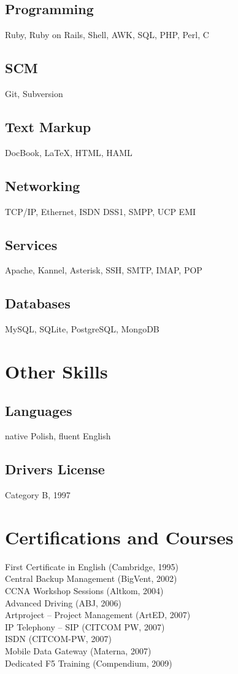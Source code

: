 \documentclass[9pt,a4paper,twocolumn]{extarticle}
\begin{document}
\subsection*{Programming}
Ruby, Ruby on Rails, Shell, AWK, SQL, PHP, Perl, C
\subsection*{SCM}
Git, Subversion
\subsection*{Text Markup}
DocBook, \LaTeX, HTML, HAML
\subsection*{Networking}
TCP/IP, Ethernet, ISDN DSS1, SMPP, UCP EMI
\subsection*{Services}
Apache, Kannel, Asterisk, SSH, SMTP, IMAP, POP
\subsection*{Databases}
MySQL, SQLite, PostgreSQL, MongoDB

\section*{Other Skills}
\subsection*{Languages}
native Polish, fluent English
\subsection*{Drivers License}
Category B, 1997

\section*{Certifications and Courses}

First Certificate in English (Cambridge, 1995)\\
Central Backup Management (BigVent, 2002)\\
CCNA Workshop Sessions (Altkom, 2004)\\
Advanced Driving (ABJ, 2006)\\
Artproject – Project Management (ArtED, 2007)\\
IP Telephony – SIP (CITCOM PW, 2007)\\
ISDN (CITCOM-PW, 2007)\\
Mobile Data Gateway (Materna, 2007)\\
Dedicated F5 Training (Compendium, 2009)
\end{document}

